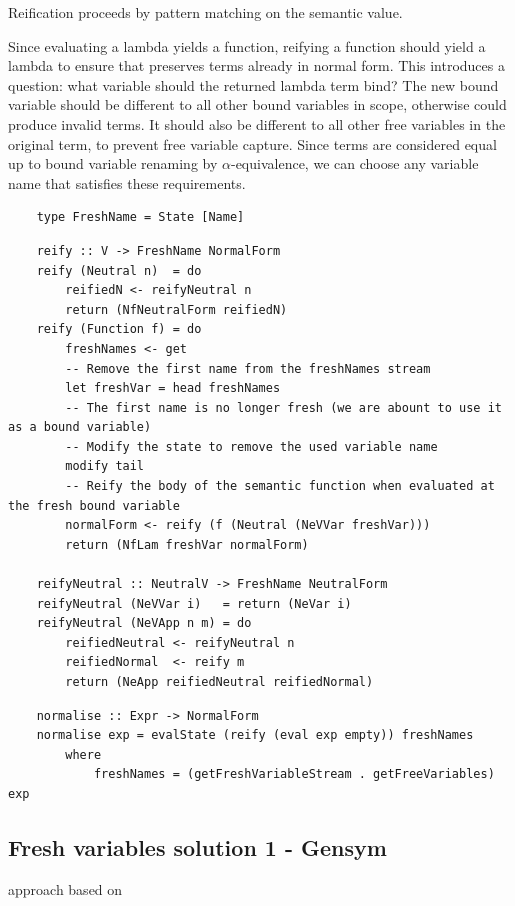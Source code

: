 Reification proceeds by pattern matching on the semantic value. 

Since evaluating a lambda yields a function, reifying a function should yield a lambda to ensure that  preserves terms already in normal form. This introduces a question: what variable should the returned lambda term bind? The new bound variable should be different to all other bound variables in scope, otherwise  could produce invalid terms. It should also be different to all other free variables in the original term, to prevent free variable capture. Since terms are considered equal up to bound variable renaming by $\alpha$-equivalence, we can choose any variable name that satisfies these requirements. 

\begin{lstlisting}
    type FreshName = State [Name]
\end{lstlisting}

\begin{lstlisting}
    reify :: V -> FreshName NormalForm
    reify (Neutral n)  = do 
        reifiedN <- reifyNeutral n
        return (NfNeutralForm reifiedN)
    reify (Function f) = do
        freshNames <- get
        -- Remove the first name from the freshNames stream
        let freshVar = head freshNames
        -- The first name is no longer fresh (we are abount to use it as a bound variable)
        -- Modify the state to remove the used variable name
        modify tail
        -- Reify the body of the semantic function when evaluated at the fresh bound variable
        normalForm <- reify (f (Neutral (NeVVar freshVar)))
        return (NfLam freshVar normalForm)

    reifyNeutral :: NeutralV -> FreshName NeutralForm
    reifyNeutral (NeVVar i)   = return (NeVar i)
    reifyNeutral (NeVApp n m) = do
        reifiedNeutral <- reifyNeutral n
        reifiedNormal  <- reify m
        return (NeApp reifiedNeutral reifiedNormal)
\end{lstlisting}


\begin{lstlisting}
    normalise :: Expr -> NormalForm
    normalise exp = evalState (reify (eval exp empty)) freshNames 
        where
            freshNames = (getFreshVariableStream . getFreeVariables) exp
\end{lstlisting}

\subsection{Fresh variables solution 1 - Gensym}
approach based on \cite{slides}

